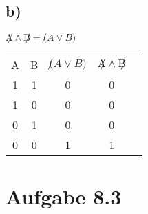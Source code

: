\documentclass{article}
\begin{document}
	\subsection*{b)}
	$\not A \land \not B = \not(A \lor B)$ \\
	\begin{tabular}[h]{c|c|c|c|c}
		A &  B & $\not(A \lor B)$   & $\not A \land \not B$ & \\
		1 & 1 & 0 & 0 \\
		1 & 0 & 0 & 0 \\
		0 & 1 & 0 & 0 \\
		0 & 0 & 1 & 1
		
	\end{tabular}
	\section*{Aufgabe 8.3}
\end{document}

